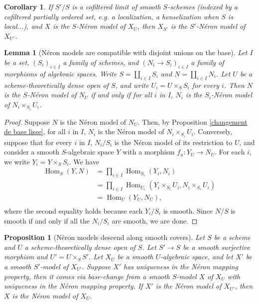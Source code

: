 \documentclass[a4paper,12pt]{amsart} %
\numberwithin{equation}{subsection}
\newcommand{\Hom}{\operatorname{Hom}}
\theoremstyle{definition}
\theoremstyle{plain}%
\newtheorem{proposition}[definition]{Proposition}
\newtheorem{lemma}[definition]{Lemma}
\newtheorem{corollary}[definition]{Corollary}
\theoremstyle{remark}
\begin{document}
\begin{corollary}\label{corollaire le NM passe aux limites d'algebres lisses}
	If $S'/S$ is a cofiltered limit of smooth $S$-schemes (indexed by a cofiltered partially ordered set, e.g. a localization, a henselization when $S$ is local...), and $X$ is the $S$-Néron model of $X_U$, then $X_{S'}$ is the $S'$-Néron model of $X_{U'}$.
\end{corollary}

\begin{lemma}[N\'eron models are compatible with disjoint unions on the base]\label{lemma:neron_models_compatible_with_disjoint_unions}
Let $I$ be a set, $(S_i)_{i\in I}$ a family of schemes, and $(N_i \to S_i)_{i\in I}$ a family of morphisms of algebraic spaces. Write $S=\coprod\limits_{i\in I}S_i$ and $N=\coprod\limits_{i\in I}N_i$. Let $U$ be a scheme-theoretically dense open of $S$, and write $U_i=U\times_S S_i$ for every $i$. Then $N$ is the $S$-N\'eron model of $N_U$ if and only if for all $i$ in $I$, $N_i$ is the $S_i$-N\'eron model of $N_i\times_{S_i} U_i$.
\end{lemma}

\begin{proof}
Suppose $N$ is the N\'eron model of $N_U$. Then, by Proposition \ref{changement de base lisse}, for all $i$ in $I$, $N_i$ is the N\'eron model of $N_i\times_{S_i}U_i$. Conversely, suppose that for every $i$ in $I$, $N_i/S_i$ is the N\'eron model of its restriction to $U$, and consider a smooth $S$-algebraic space $Y$ with a morphism $f_u\colon Y_U \to N_U$. For each $i$, we write $Y_i=Y\times_S S_i$. We have
\begin{align*}
\Hom_S(Y,N) & = \prod\limits_{i\in I} \Hom_{S_i}(Y_i,N_i)\\
& = \prod\limits_{i\in I} \Hom_{U_i}(Y_i\times_{S_i} U_i, N_i\times_{S_i} U_i)\\
& = \Hom_U(Y_U, N_U),\\
\end{align*}
where the second equality holds because each $Y_i/S_i$ is smooth. Since $N/S$ is smooth if and only if all the $N_i/S_i$ are smooth, we are done.
\end{proof}


\begin{proposition}[N\'eron models descend along smooth covers]\label{proposition descente lisse du NM}
	Let $S$ be a scheme and $U$ a scheme-theoretically dense open of $S$. Let $S'\to S$ be a smooth surjective morphism and $U'=U\times_S S'$. Let $X_U$ be a smooth $U$-algebraic space, and let $X'$ be a smooth $S'$-model of $X_{U'}$. Suppose $X'$ has uniqueness in the Néron mapping property, then it comes via base-change from a smooth $S$-model $X$ of $X_U$ with uniqueness in the Néron mapping property. If $X'$ is the Néron model of $X_{U'}$, then $X$ is the Néron model of $X_U$.
\end{proposition}
\end{document}
